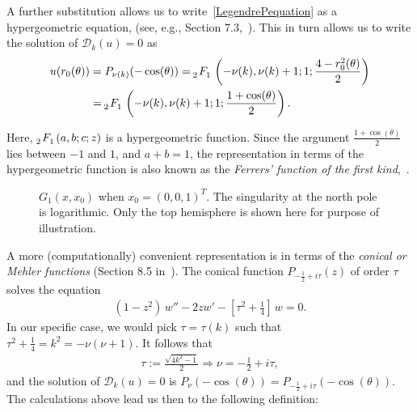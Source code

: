 \documentclass[final]{siamltex}
\begin{document}
A further substitution allows us to write~\eqref{LegendrePequation} as a
hypergeometric equation, (see, e.g., Section 7.3,~\cite{lebedev}). This
in turn allows us to write the solution of $\mathcal{D}_k(u)=0$ as 
\begin{align*} 
  u(r_0(\theta)) &= P_{\nu(k)}(-\cos(\theta)) = 
    \tensor[_2]{F}{_1}\left(-\nu(k), \nu(k)+  1; 1; 
      \frac{4-r_0^2(\theta)}{2}\right) \\
    &=\tensor[_2]{F}{_1}\left(-\nu(k), \nu(k)+  1; 1;
    \frac{1+\cos(\theta)}{2}\right).
\end{align*} 

Here, $\tensor[_2]{F}{_1}(a,b;c;z)$ is a hypergeometric function. Since
the argument $\frac{1+\cos(\theta)}{2}$ lies between $-1$ and $1$, and
$a+b = 1$, the representation in terms of the hypergeometric function is
also known as the {\it Ferrers' function of the first
kind},~\cite{fatAbramowitz}. 

\begin{figure}
  \centering
  
  \caption{\label{f:greensFun} $G_1(x,x_0)$ when $x_0=(0,0,1)^T$. The
  singularity at the north pole is logarithmic. Only the top hemisphere
  is shown here for purpose of illustration.}
\end{figure}
A more (computationally) convenient representation is in terms of the
{\it conical or Mehler functions} (Section 8.5 in~\cite{lebedev}). The
conical function $P_{-\frac{1}{2}+ i \tau}(z)$ of order $\tau$ solves
the equation
\begin{align*}
  (1-z^2)\,w'' -2zw' - \left[\tau^2+\frac{1}{4}\right]\,w = 0.
\end{align*}
In our specific case, we would pick $\tau = \tau(k)$ such that
$\tau^2+\frac{1}{4}=k^2 = -\nu(\nu+1).$  It follows that 
\begin{align*}
  \tau:=\frac{\sqrt{4k^2-1}}{2} \Rightarrow  \nu= -\frac{1}{2}+i\tau, 
\end{align*}
and the solution of $\mathcal{D}_k(u)=0$ is $
  P_{\nu} (-\cos(\theta)) = P_{-\frac{1}{2} + i \tau} 
    (-\cos(\theta)).$
The calculations above lead us then to the following definition:
\end{document}
